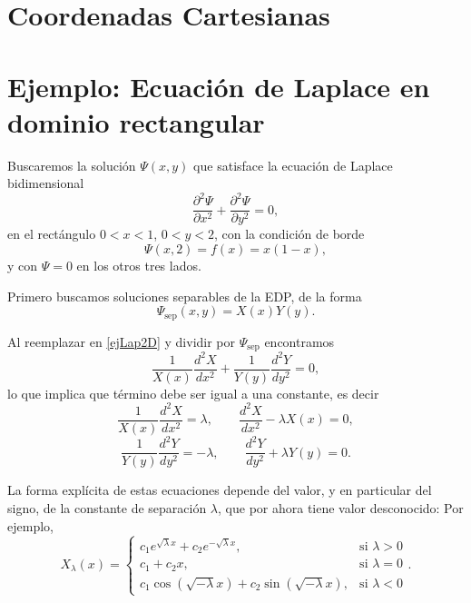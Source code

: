 \section{Coordenadas Cartesianas}
\section{Ejemplo: Ecuación de Laplace en dominio rectangular}
Buscaremos la solución $\Psi(x,y)$ que satisface la ecuación de Laplace bidimensional
\begin{equation}\label{ejLap2D}
    \frac{\partial^2\Psi }{\partial x^2}+\frac{\partial^2\Psi }{\partial y^2}=0,
\end{equation}
en el rectángulo $0<x<1$, $0<y<2$, con la condición de borde
\begin{equation}
    \Psi(x,2) = f(x) = x(1-x),
\end{equation}
y con $\Psi=0$ en los otros tres lados.

Primero buscamos soluciones separables de la EDP, de la forma
\begin{equation}
    \Psi_\text{sep}(x,y)=X(x)Y(y).
\end{equation}

Al reemplazar en \eqref{ejLap2D} y dividir por $\Psi_\text{sep}$ encontramos
\begin{equation}
    \frac{1}{X(x)}\frac{d^2X}{dx^2}+\frac{1}{Y(y)}\frac{d^2Y}{dy^2} = 0,
\end{equation}
lo que implica que término debe ser igual a una constante, es decir
\begin{equation}
    \frac{1}{X(x)}\frac{d^2X}{dx^2} = \lambda, \qquad \frac{d^2X}{dx^2}-\lambda X(x)=0,
\end{equation}
\begin{equation}
    \frac{1}{Y(y)}\frac{d^2Y}{dy^2} = -\lambda, \qquad \frac{d^2Y}{dy^2}+\lambda Y(y)=0.
\end{equation}

La forma explícita de estas ecuaciones depende del valor, y en particular del signo, de la constante de separación $\lambda$, que por ahora tiene valor desconocido: Por ejemplo,
\begin{equation}
    X_\lambda(x)= 	\begin{cases}
        c_1e^{\sqrt{\lambda}x} + c_2e^{-\sqrt{\lambda}x},      & \text{si }\lambda>0  \\
        c_1 + c_2x,                                            & \text{si } \lambda=0 \\
        c_1\cos(\sqrt{-\lambda}x) + c_2\sin(\sqrt{-\lambda}x), & \text{si } \lambda<0
    \end{cases}.
\end{equation}

